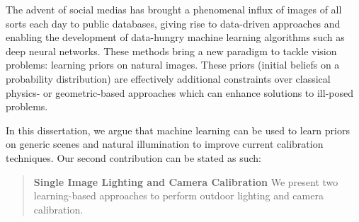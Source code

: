 The advent of social medias has brought a phenomenal influx of images of all sorts each day to public databases, giving rise to data-driven approaches and enabling the development of data-hungry machine learning algorithms such as deep neural networks. These methods bring a new paradigm to tackle vision problems: learning priors on natural images. These priors (initial beliefs on a probability distribution) are effectively additional constraints over classical physics- or geometric-based approaches which can enhance solutions to ill-posed problems.

In this dissertation, we argue that machine learning can be used to learn priors on generic scenes and natural illumination to improve current calibration techniques. Our second contribution can be stated as such:
\begin{quotation}
\textbf{Single Image Lighting and Camera Calibration} We present two learning-based approaches to perform outdoor lighting and camera calibration.
\end{quotation}

